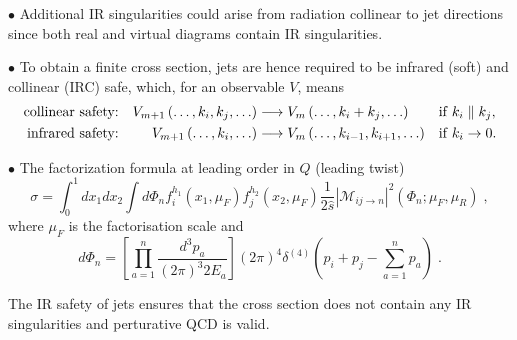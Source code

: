 \documentclass[9pt,a4paper,unknownkeysallowed,xcolor=dvipsnames,aspectratio=43]{beamer}
\begin{document}
\begin{frame}

{\color{darkred}\Large$\bullet$} Additional IR singularities could arise from radiation collinear to jet directions since both real and virtual diagrams contain IR singularities.\\\vspace{2mm}

{\color{darkred}\Large$\bullet$} To obtain a finite cross section, {\color{darkred}jets are hence required to be infrared (soft) and collinear (IRC) safe}, which, for an observable $V$, means
\begin{align}
\text{collinear safety:}&&
V_{m+1}\left(\ldots,k_i,k_j,\ldots\right)&\longrightarrow V_{m}\left(\ldots,k_i+k_j,\ldots\right) &&\mathrm{if}\;k_i\parallel k_j ,\notag\\
\text{infrared safety:}&&
V_{m+1}\left(\ldots,k_i,\ldots\right)&\longrightarrow V_{m}\left(\ldots,k_{i-1},k_{i+1},\ldots\right) &&\mathrm{if}\;k_i\to 0.\notag
\end{align}

{\color{darkred}\Large$\bullet$} {\color{darkred}The factorization formula} at leading order in $Q$ (leading twist)
\begin{equation}
\sigma = \int_0^1 dx_1 dx_2 \int d\Phi_n f_i^{h_1}(x_1,\mu_F) f_j^{h_2}(x_2, \mu_F) \frac{1}{2 \hat{s}} |\mathcal{M}_{ij \to n}|^2(\Phi_n;\mu_F,\mu_R)\;,
\label{eq:master}
\end{equation}
where $\mu_F$ is the factorisation scale and
\begin{equation}
d\Phi_n = \left[\prod_{a=1}^{n} \frac{d^3p_a}{(2\pi)^3 2 E_a} \right](2 \pi)^4 \delta^{(4)}(p_i + p_j - \sum_{a=1}^{n} p_a)\;.
\label{eq:dLIPS}
\end{equation}

{
The IR safety of jets ensures that the cross section does not contain any IR singularities and perturative QCD is valid. 
}
\end{frame}
%
%
\end{document}
